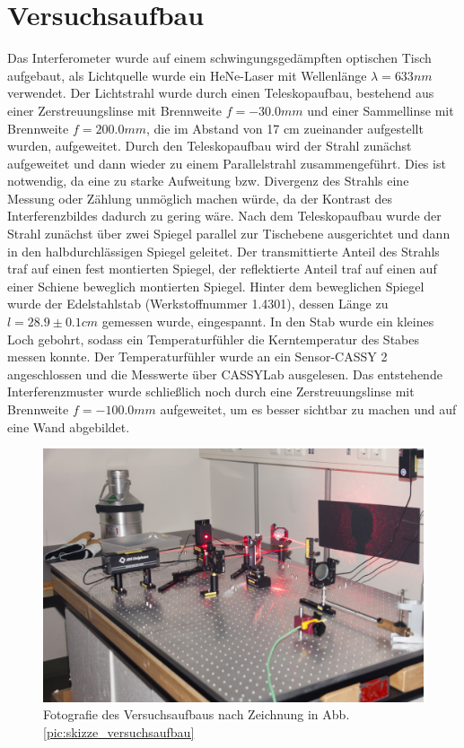 \section{Versuchsaufbau}

Das Interferometer wurde auf einem schwingungsgedämpften optischen Tisch aufgebaut, als Lichtquelle wurde ein HeNe-Laser mit Wellenlänge $\lambda=633 nm$ verwendet. Der Lichtstrahl wurde durch einen Teleskopaufbau, bestehend aus einer Zerstreuungslinse mit Brennweite $f=-30.0 mm$ und einer Sammellinse mit Brennweite $f=200.0 mm$, die im Abstand von 17 cm zueinander aufgestellt wurden, aufgeweitet. Durch den Teleskopaufbau wird der Strahl zunächst aufgeweitet und dann wieder zu einem Parallelstrahl zusammengeführt. Dies ist notwendig, da eine zu starke Aufweitung bzw. Divergenz des Strahls eine Messung oder Zählung unmöglich machen würde, da der Kontrast des Interferenzbildes dadurch zu gering wäre. Nach dem Teleskopaufbau wurde der Strahl zunächst über zwei Spiegel parallel zur Tischebene ausgerichtet und dann in den halbdurchlässigen Spiegel geleitet. Der transmittierte Anteil des Strahls traf auf einen fest montierten Spiegel, der reflektierte Anteil traf auf einen auf einer Schiene beweglich montierten Spiegel. Hinter dem beweglichen Spiegel wurde der Edelstahlstab (Werkstoffnummer 1.4301), dessen Länge zu $l=28.9\pm0.1 cm$ gemessen wurde, eingespannt. In den Stab wurde ein kleines Loch gebohrt, sodass ein Temperaturfühler die Kerntemperatur des Stabes messen konnte. Der Temperaturfühler wurde an ein Sensor-CASSY 2 angeschlossen und die Messwerte über CASSYLab ausgelesen. Das entstehende Interferenzmuster wurde schließlich noch durch eine Zerstreuungslinse mit Brennweite $f=-100.0 mm$ aufgeweitet, um es besser sichtbar zu machen und auf eine Wand abgebildet.

\begin{figure}
\centering
	\includegraphics[width=.8\textwidth]{images/versuchsaufbau.jpg}
	\caption{Fotografie des Versuchsaufbaus nach Zeichnung in Abb. \ref{pic:skizze_versuchsaufbau}}
\end{figure}

